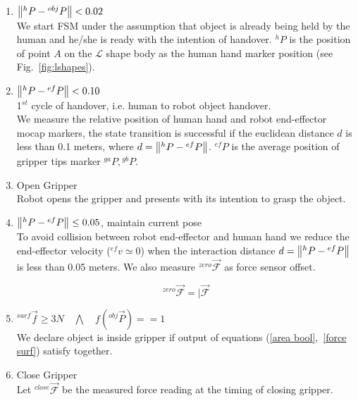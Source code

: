\begin{enumerate}[start=0,label={\bf{t}\arabic*:}]
    \item $\norm{{}^h{P} - {}^{obj}{P}} < 0.02$\\
    We start FSM under the assumption that object is already being held by the human and he/she is ready with the intention of handover. ${}^h{P}$ is the position of point $A$ on the $\mathcal{L}$ shape body as the human hand marker position (see Fig.~\ref{fig:lshapes}).
    
    
    \item $\norm{{}^h{P} - {}^{ef}{P}} < 0.10$\\
    1$^{st}$ cycle of handover, i.e. human to robot object handover.\\
    We measure the relative position of human hand and robot end-effector mocap markers, the state transition is successful if the euclidean distance $d$ is less than 0.1 meters, where $d = \norm{{}^h{P} - {}^{ef}{P}}$. ${}^{ef}{P}$ is the average position of gripper tips marker ${}^{ga}P, {}^{gb}P$. 
    
    \item Open Gripper\\
    Robot opens the gripper and presents with its intention to grasp the object.
    
    \item $\norm{{}^h{P} - {}^{ef}{P}} \leq 0.05$, maintain current pose\\
    To avoid collision between robot end-effector and human hand we reduce the end-effector velocity (${}^{ef}v\simeq0$) when the interaction distance $d = \norm{{}^h{P} - {}^{ef}{P}}$ is less than 0.05 meters. We also measure ${}^{zero}\vec{\mathcal{F}}$ as force sensor offset.

    \begin{equation}\label{Fzero}
        {}^{zero}\vec{\mathcal{F}} = \vert{\vec{\mathcal{F}}}
    \end{equation}

    \item ${}^{surf}\vec{f} \geq 3N \quad \bigwedge \quad f({}^{obj}\vec{P})  == 1$\\
    We declare object is inside gripper if output of equations (\ref{area bool},~\ref{force surf}) satisfy together.
    
    \item Close Gripper\\
    Let ${}^{close}\vec{\mathcal{F}}$ be the measured force reading at the timing of closing gripper.
        

\end{enumerate}
